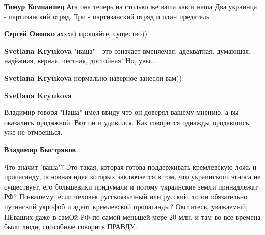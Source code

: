 \begin{itemize}
\begin{itemize}
 
\textbf{Тимур Компаниец} Ага она теперь на столько же ваша как и наша \Smiley[1.0][yellow]
Два украинца - партизанский отряд. Три - партизанский отряд и один предатель ...

 
\textbf{Сергей Онопко} аххха) прощайте, существо))

 
\textbf{Svetlana Kryukova} "наша" - это означает вменяемая, адекватная, думающая, надёжная, верная, честная, достойная! Но, увы...

 
\textbf{Svetlana Kryukova} нормально наверное занесли вам))

 
\textbf{Svetlana Kryukova} 

Владимир говоря "Наша" имел ввиду что он доверял вашему мнению, а вы оказались
продажной. Вот он и удивился. Как говорится однажды продавшись, уже не
отмоешься.

 
\textbf{Владимир Быстряков} 

Что значит "ваша"? Это такая, которая готова поддерживать кремлевскую ложь и
пропаганду, основная идея которых заключается в том, что украинского этноса не
существует, его большевики придумали и потому украинские земли принадлежат РФ?
По-вашему, если человек русскоязычный или русский, то он обязательно путинский
укрофоб и адепт кремлевской пропаганды? Окститесь, уважаемый, НЕваших даже в
самОй РФ по самой меньшей мере 20 млн, и там во все времена были люди,
способные говорить ПРАВДУ.


\end{itemize}
\end{itemize}
